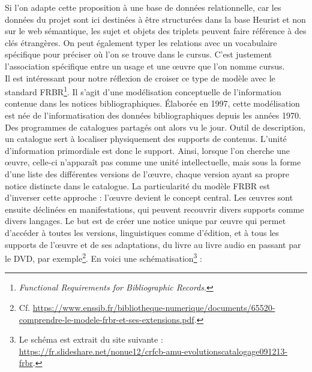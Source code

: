 \documentclass[a4paper,12pt,twoside]{book}
\begin{document}
	Si l'on adapte cette proposition à une base de données relationnelle, car les données du projet sont ici destinées à être structurées dans la base Heurist et non sur le web sémantique, les sujet et objets des triplets peuvent faire référence à des clés étrangères. On peut également typer les relations avec un vocabulaire spécifique pour préciser où l’on se trouve dans le cursus. C'est justement l'association spécifique entre un usage et une œuvre que l'on nomme cursus.\\
	
	Il est intéressant pour notre réflexion de croiser ce type de modèle avec le standard FRBR\footnote{\textit{Functional Requirements for Bibliographic Records}.}. Il s’agit d’une modélisation conceptuelle de l'information contenue dans les notices bibliographiques. Élaborée en 1997, cette modélisation est née de l'informatisation des données bibliographiques depuis les années 1970. Des programmes de catalogues partagés ont alors vu le jour. Outil de description, un catalogue sert à localiser physiquement des supports de contenus. L’unité d’information primordiale est donc le support. Ainsi, lorsque l’on cherche une œuvre, celle-ci n’apparaît pas comme une unité intellectuelle, mais sous la forme d’une liste des différentes versions de l’œuvre, chaque version ayant sa propre notice distincte dans le catalogue. La particularité du modèle FRBR est d'inverser cette approche : l’œuvre devient le concept central. Les œuvres sont ensuite déclinées en manifestations, qui peuvent recouvrir divers supports comme divers langages. Le but est de créer une notice unique par œuvre qui permet d’accéder à toutes les versions, linguistiques comme d'édition, et à tous les supports de l’œuvre et de ses adaptations, du livre au livre audio en passant par le DVD, par exemple\footnote{Cf. \url{https://www.enssib.fr/bibliotheque-numerique/documents/65520-comprendre-le-modele-frbr-et-ses-extensions.pdf}.}. En voici une schématisation\footnote{Le schéma est extrait du site suivante : \url{https://fr.slideshare.net/nonue12/crfcb-amu-evolutionscatalogage091213-frbr}.} : 
	
\end{document}
